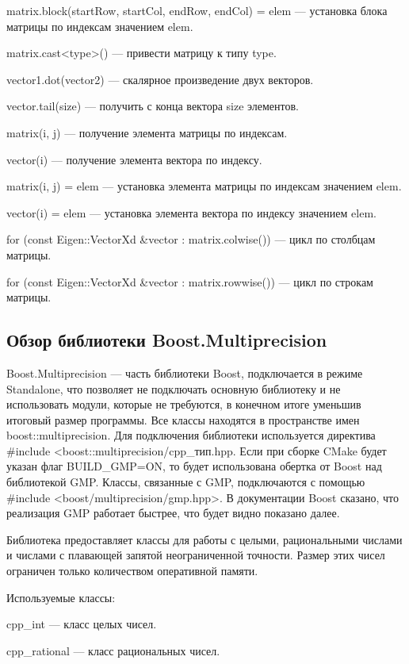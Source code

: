 matrix.block(startRow, startCol, endRow, endCol) = elem --- установка блока матрицы по индексам значением elem.

matrix.cast<type>() --- привести матрицу к типу type.

vector1.dot(vector2) --- скалярное произведение двух векторов.

vector.tail(size) --- получить с конца вектора size элементов.

matrix(i, j) --- получение элемента матрицы по индексам.

vector(i) --- получение элемента вектора по индексу.

matrix(i, j) = elem --- установка элемента матрицы по индексам значением elem.

vector(i) = elem --- установка элемента вектора по индексу значением elem.

for (const Eigen::VectorXd \&vector : matrix.colwise()) --- цикл по столбцам матрицы.

for (const Eigen::VectorXd \&vector : matrix.rowwise()) --- цикл по строкам матрицы.

\subsection{Обзор библиотеки Boost.Multiprecision}

Boost.Multiprecision --- часть библиотеки Boost, подключается в режиме Standalone, что позволяет не подключать основную библиотеку и не использовать модули, которые не требуются, в конечном итоге уменьшив итоговый размер программы. Все классы находятся в пространстве имен boost::multiprecision. Для подключения библиотеки используется директива \#include <boost::mul\-ti\-pre\-ci\-si\-on/cpp\_тип.hpp. Если при сборке CMake будет указан флаг BUILD\_GMP=ON, то будет использована обертка от Boost над библиотекой GMP. Классы, связанные с GMP, подключаются с помощью \#include <boost/mul\-ti\-pre\-ci\-si\-on/gmp.hpp>. В документации Boost сказано, что реализация GMP работает быстрее, что будет видно показано далее.

Библиотека предоставляет классы для работы с целыми, рациональными числами и числами с плавающей запятой неограниченной точности. Размер этих чисел ограничен только количеством оперативной памяти. 

Используемые классы:

cpp\_int --- класс целых чисел.

cpp\_rational --- класс рациональных чисел.

